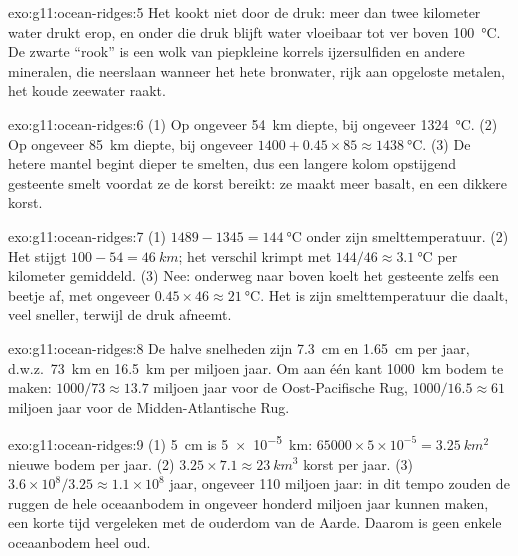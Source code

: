 \begin{solution}{exo:g11:ocean-ridges:5}
Het kookt niet door de druk: meer dan twee kilometer water drukt erop,
en onder die druk blijft water vloeibaar tot ver boven
\qty{100}{\celsius}. De zwarte ``rook'' is een wolk van piepkleine korrels
ijzersulfiden en andere mineralen, die neerslaan wanneer het hete bronwater, rijk
aan opgeloste metalen, het koude zeewater raakt.
\end{solution}

\begin{solution}{exo:g11:ocean-ridges:6}
(1) Op ongeveer \qty{54}{km} diepte, bij ongeveer \qty{1324}{\celsius}. (2) Op
ongeveer \qty{85}{km} diepte, bij ongeveer $1400 + 0.45 \times 85 \approx
\qty{1438}{\celsius}$. (3) De hetere mantel begint dieper te smelten, dus een
langere kolom opstijgend gesteente smelt voordat ze de korst bereikt: ze maakt meer
basalt, en een dikkere korst.
\end{solution}

\begin{solution}{exo:g11:ocean-ridges:7}
(1) $1489 - 1345 = \qty{144}{\celsius}$ onder zijn smelttemperatuur.
(2) Het stijgt $100 - 54 = \qty{46}{km}$; het verschil krimpt met
$144/46 \approx \qty{3.1}{\celsius}$ per kilometer gemiddeld. (3) Nee: onderweg
naar boven koelt het gesteente zelfs een beetje af, met ongeveer $0.45 \times 46 \approx
\qty{21}{\celsius}$. Het is zijn smelttemperatuur die daalt, veel sneller,
terwijl de druk afneemt.
\end{solution}

\begin{solution}{exo:g11:ocean-ridges:8}
De halve snelheden zijn \qty{7.3}{cm} en \qty{1.65}{cm} per jaar, d.w.z.\
\qty{73}{km} en \qty{16.5}{km} per miljoen jaar. Om aan één kant \qty{1000}{km}
bodem te maken: $1000/73 \approx 13.7$ miljoen jaar voor de Oost-Pacifische
Rug, $1000/16.5 \approx 61$ miljoen jaar voor de Midden-Atlantische Rug.
\end{solution}

\begin{solution}{exo:g11:ocean-ridges:9}
(1) \qty{5}{cm} is \qty{5e-5}{km}: $65000 \times 5 \times 10^{-5} =
\qty{3.25}{km^2}$ nieuwe bodem per jaar. (2) $3.25 \times 7.1 \approx
\qty{23}{km^3}$ korst per jaar. (3) $3.6 \times 10^8 / 3.25 \approx 1.1
\times 10^8$ jaar, ongeveer 110 miljoen jaar: in dit tempo zouden de ruggen de hele
oceaanbodem in ongeveer honderd miljoen jaar kunnen maken, een korte tijd
vergeleken met de ouderdom van de Aarde. Daarom is geen enkele oceaanbodem heel oud.
\end{solution}

